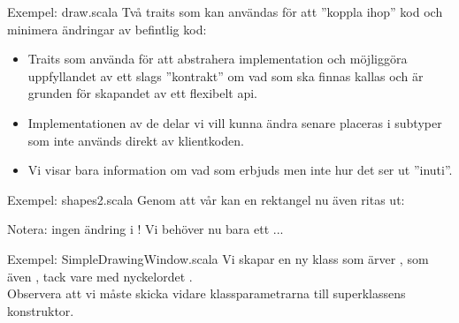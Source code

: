 \begin{Slide}{Exempel: draw.scala}
Två traits som kan användas för att ''koppla ihop'' kod och minimera ändringar av befintlig kod:

\pause
\setlength{\leftmargini}{0pt}
\begin{itemize}\SlideFontSmall
\item  Traits som använda för att abstrahera implementation och möjliggöra uppfyllandet av ett slags ''kontrakt'' om vad som ska finnas kallas   och är grunden för skapandet av ett flexibelt api. 

\item Implementationen av de delar vi vill kunna ändra senare placeras i subtyper som inte används direkt av klientkoden. 

\item Vi visar bara information om vad som erbjuds men inte hur det ser ut ''inuti''.

\end{itemize}
\end{Slide}

\begin{Slide}{Exempel: shapes2.scala}\SlideFontTiny
Genom att  vår  kan en rektangel nu även ritas ut:


\pause
\vspace{-0.5em}Notera: ingen ändring i ! Vi behöver nu bara ett ...
\end{Slide}


\begin{Slide}{Exempel: SimpleDrawingWindow.scala}\SlideFontTiny
\vspace{-0.35em}
Vi skapar en ny klass som ärver , som  även  , tack vare  med nyckelordet .\\
Observera att vi måste skicka vidare klassparametrarna till superklassens konstruktor. 


\pause
\vspace{-0.35em}
\end{Slide}


